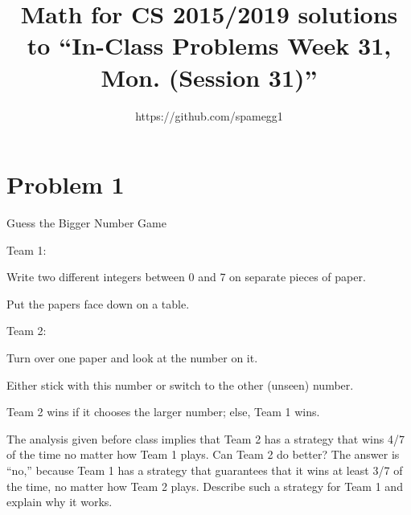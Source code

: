 \documentclass[14pt]{extarticle}
\title{Math for CS 2015/2019 solutions to ``In-Class Problems Week 31, Mon. (Session 31)''}
\author{https://github.com/spamegg1}
\begin{document}
\maketitle
\tableofcontents

\section{Problem 1}
Guess the Bigger Number Game

Team 1:

Write two different integers between 0 and 7 on separate pieces of paper.

Put the papers face down on a table.

Team 2:

Turn over one paper and look at the number on it.

Either stick with this number or switch to the other (unseen) number.

Team 2 wins if it chooses the larger number; else, Team 1 wins.

The analysis given before class implies that Team 2 has a strategy that wins 4/7 of the time no matter how Team 1 plays. Can Team 2 do better? The answer is “no,” because Team 1 has a strategy that guarantees that it wins at least 3/7 of the time, no matter how Team 2 plays. Describe such a strategy for Team 1 and explain why it works.
\end{document}
